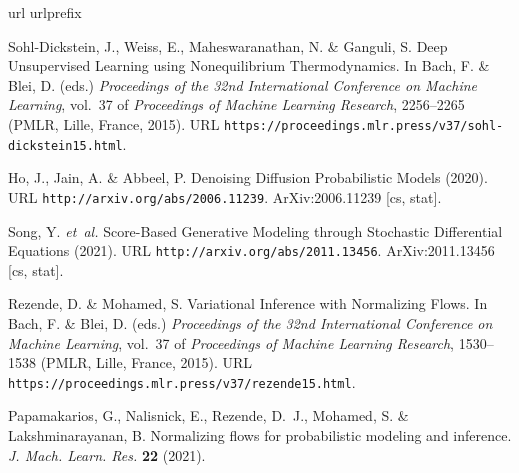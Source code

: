 \documentclass[11pt,onecolumn]{article}
\begin{document}
\begin{thebibliography}{10}
\expandafter\ifx\csname url\endcsname\relax
  \def\url#1{\texttt{#1}}\fi
\expandafter\ifx\csname urlprefix\endcsname\relax\def\urlprefix{URL }\fi
\providecommand{\bibinfo}[2]{#2}
\providecommand{\eprint}[2][]{\url{#2}}

\bibinfo{author}{Sohl-Dickstein, J.}, \bibinfo{author}{Weiss, E.}, \bibinfo{author}{Maheswaranathan, N.} \& \bibinfo{author}{Ganguli, S.}
\newblock \bibinfo{title}{Deep {Unsupervised} {Learning} using {Nonequilibrium} {Thermodynamics}}.
\newblock In \bibinfo{editor}{Bach, F.} \& \bibinfo{editor}{Blei, D.} (eds.) \emph{\bibinfo{booktitle}{Proceedings of the 32nd {International} {Conference} on {Machine} {Learning}}}, vol.~\bibinfo{volume}{37} of \emph{\bibinfo{series}{Proceedings of {Machine} {Learning} {Research}}}, \bibinfo{pages}{2256--2265} (\bibinfo{publisher}{PMLR}, \bibinfo{address}{Lille, France}, \bibinfo{year}{2015}).
\newblock \urlprefix\url{https://proceedings.mlr.press/v37/sohl-dickstein15.html}.

\bibinfo{author}{Ho, J.}, \bibinfo{author}{Jain, A.} \& \bibinfo{author}{Abbeel, P.}
\newblock \bibinfo{title}{Denoising {Diffusion} {Probabilistic} {Models}} (\bibinfo{year}{2020}).
\newblock \urlprefix\url{http://arxiv.org/abs/2006.11239}.
\newblock \bibinfo{note}{ArXiv:2006.11239 [cs, stat]}.

\bibinfo{author}{Song, Y.} \emph{et~al.}
\newblock \bibinfo{title}{Score-{Based} {Generative} {Modeling} through {Stochastic} {Differential} {Equations}} (\bibinfo{year}{2021}).
\newblock \urlprefix\url{http://arxiv.org/abs/2011.13456}.
\newblock \bibinfo{note}{ArXiv:2011.13456 [cs, stat]}.

\bibinfo{author}{Rezende, D.} \& \bibinfo{author}{Mohamed, S.}
\newblock \bibinfo{title}{Variational {Inference} with {Normalizing} {Flows}}.
\newblock In \bibinfo{editor}{Bach, F.} \& \bibinfo{editor}{Blei, D.} (eds.) \emph{\bibinfo{booktitle}{Proceedings of the 32nd {International} {Conference} on {Machine} {Learning}}}, vol.~\bibinfo{volume}{37} of \emph{\bibinfo{series}{Proceedings of {Machine} {Learning} {Research}}}, \bibinfo{pages}{1530--1538} (\bibinfo{publisher}{PMLR}, \bibinfo{address}{Lille, France}, \bibinfo{year}{2015}).
\newblock \urlprefix\url{https://proceedings.mlr.press/v37/rezende15.html}.

\bibinfo{author}{Papamakarios, G.}, \bibinfo{author}{Nalisnick, E.}, \bibinfo{author}{Rezende, D.~J.}, \bibinfo{author}{Mohamed, S.} \& \bibinfo{author}{Lakshminarayanan, B.}
\newblock \bibinfo{title}{Normalizing flows for probabilistic modeling and inference}.
\newblock \emph{\bibinfo{journal}{J. Mach. Learn. Res.}} \textbf{\bibinfo{volume}{22}} (\bibinfo{year}{2021}).


\end{thebibliography}
\end{document}
